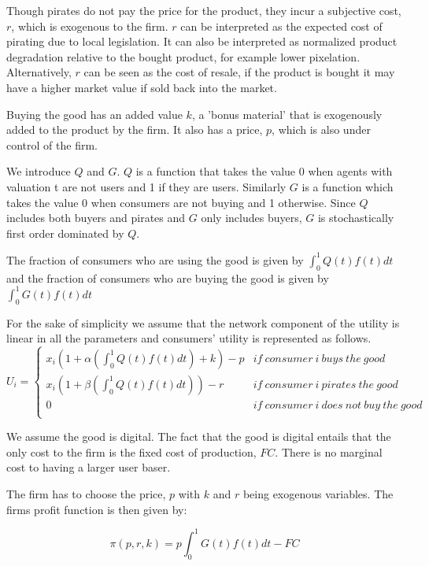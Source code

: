\documentclass[12pt]{report}
\numberwithin{equation}{section}
\begin{document}
Though pirates do not pay the price for the product, they incur a subjective cost, $r$, which is exogenous to the firm. $r$ can be interpreted as the expected cost of pirating due to local legislation. It can also be interpreted as normalized product degradation relative to the bought product, for example lower pixelation. Alternatively, $r$ can be seen as the cost of resale, if the product is bought it may have a higher market value if sold back into the market. 

Buying the good has an added value $k$, a 'bonus material' that is exogenously added to the product by the firm. It also has a price, $p$, which is also under control of the firm.

We introduce $Q$ and $G$. $Q$ is a function that takes the value 0 when agents with valuation t are not users and 1 if they are users. Similarly $G$ is a function which takes the value 0 when consumers are not buying and 1 otherwise. Since $Q$ includes both buyers and pirates and $G$ only includes buyers, $G$ is stochastically first order dominated by $Q$.

The fraction of consumers who are using the good is given by $ \int^{1}_{0}Q(t)f(t)dt$ and the fraction of consumers who are buying the good is given by $ \int^{1}_{0}G(t)f(t)dt$

For the sake of simplicity we assume that the network component of the utility is linear in all the parameters and consumers' utility is represented as follows. 
\[
U_i= \left\{
                \begin{array}{ll}
                  x_i(1+\alpha (\int^{1}_{0}Q(t)f(t)dt) +k ) -p  & if ~ consumer ~ i ~ buys ~ the ~  good  \\
                  x_i(1+\beta (\int^{1}_{0}Q(t)f(t)dt) ) -r &  if ~ consumer ~i ~ pirates ~ the ~  good \\
									0 &  if ~ consumer ~ i ~ does ~ not ~ buy ~ the ~ good   \\
                \end{array}
\right.
\]


We assume the good is digital. The fact that the good is digital entails that the only cost to the firm is the fixed cost of production, $FC$. There is no marginal cost to having a larger user baser. 

The firm has to choose the price,  $p$ with $k$ and $r$ being exogenous variables. The firms profit function is then given by:



\begin{equation} \label{eq:profit1}
\pi(p,r,k)
=p \int^{1}_{0}G(t)f(t)dt -FC
\end{equation}
\end{document}
